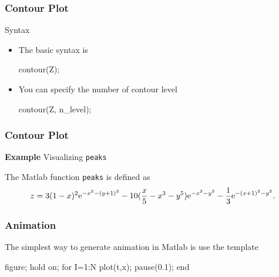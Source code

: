 \documentclass{beamer}  %
\begin{document}
\begin{frame}[fragile]
\frametitle{Contour Plot}

\begin{block}{Syntax}
\begin{itemize}[<+->]
    \item The basic syntax is
          \begin{matlabcodebeamer}[numbers=none,frame=none]
          contour(Z);
          \end{matlabcodebeamer}
    \item You can specify the number of contour level
          \begin{matlabcodebeamer}[numbers=none,frame=none]
          contour(Z, n_level);
          \end{matlabcodebeamer}
\end{itemize}
\end{block}
\end{frame}
\begin{frame}[fragile]
\frametitle{Contour Plot}
\textbf{Example} Visualizing \texttt{peaks}

The Matlab function \texttt{peaks} is defined as
\begin{equation}
    z = 3(1-x)^2 \textrm{e}^{-x^2 - (y+1)^2} - 10(\frac{x}{5}-x^3-y^5)\textrm{e}^{-x^2-y^2}-
    \frac{1}{3}\textrm{e}^{-(x+1)^2-y^2}.
\end{equation}\pause

\setcounter{subfigure}{0}
\begin{figure}
    \centering
\end{figure}

\end{frame}
\begin{frame}[fragile]
\frametitle{Animation}
The simplest way to generate animation in Matlab is use the template
\begin{matlabcode}[numbers=none,frame=none]
          figure;
          hold on;    
          for I=1:N
              plot(t,x);  %
              pause(0.1); %
          end
\end{matlabcode}

\end{frame}
\end{document}
